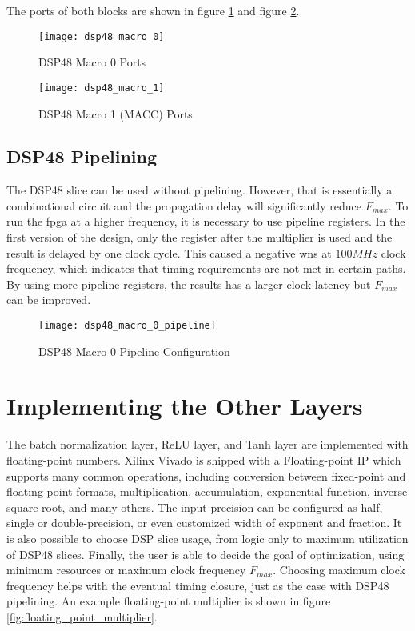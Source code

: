 The ports of both blocks are shown in figure \ref{fig:dsp48_macro_0} and figure \ref{fig:dsp48_macro_1}.

\begin{figure}[h]
  \centering
  \texttt{[image: dsp48\_macro\_0]}
  \caption{DSP48 Macro 0 Ports}
  \label{fig:dsp48_macro_0}
\end{figure}

\begin{figure}[h]
  \centering
  \texttt{[image: dsp48\_macro\_1]}
  \caption{DSP48 Macro 1 (MACC) Ports}
  \label{fig:dsp48_macro_1}
\end{figure}

\subsection{DSP48 Pipelining}

The DSP48 slice can be used without pipelining. However, that is essentially a combinational circuit and
the propagation delay will significantly reduce $F_{max}$. To run the \gls{fpga} at a higher frequency, it is
necessary to use pipeline registers. In the first version of the design, only the register after the
multiplier is used and the result is delayed by one clock cycle. This caused a negative \gls{wns} at
$100 MHz$ clock frequency, which indicates that timing requirements are not met in certain paths. By
using more pipeline registers, the results has a larger clock latency but $F_{max}$ can be improved.

\begin{figure}[h]
  \centering
  \texttt{[image: dsp48\_macro\_0\_pipeline]}
  \caption{DSP48 Macro 0 Pipeline Configuration}
  \label{fig:dsp48_macro_0_pipeline}
\end{figure}

\section{Implementing the Other Layers}

The batch normalization layer, ReLU layer, and Tanh layer are implemented with floating-point numbers.
Xilinx Vivado is shipped with a Floating-point IP which supports many common operations, including
conversion between fixed-point and floating-point formats, multiplication, accumulation, exponential function,
inverse square root, and many others. The input precision can be configured as half, single or
double-precision, or even customized width of exponent and fraction. It is also possible to choose
DSP slice usage, from logic only to maximum utilization of DSP48 slices. Finally, the user is able to decide
the goal of optimization, using minimum resources or maximum clock frequency $F_{max}$. Choosing maximum
clock frequency helps with the eventual timing closure, just as the case with DSP48 pipelining. An example
floating-point multiplier is shown in figure \ref{fig:floating_point_multiplier}.

